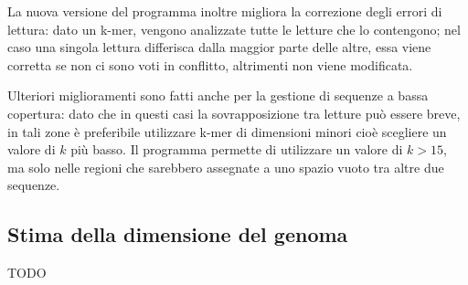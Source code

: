 \documentclass[crop=false, class=book]{standalone}
\begin{document}
	La nuova versione del programma inoltre migliora la correzione degli errori di lettura: dato un k-mer, vengono analizzate tutte le letture che lo contengono; nel caso una singola lettura differisca dalla maggior parte delle altre, essa viene corretta se non ci sono voti in conflitto, altrimenti non viene modificata.
	
	Ulteriori miglioramenti sono fatti anche per la gestione di sequenze a bassa copertura: dato che in questi casi la sovrapposizione tra letture può essere breve, in tali zone è preferibile utilizzare k-mer di dimensioni minori cioè scegliere un valore di $k$ più basso. Il programma permette di utilizzare un valore di $k>15$, ma solo nelle regioni che sarebbero assegnate a uno spazio vuoto tra altre due sequenze. 
	
	\subsection{Stima della dimensione del genoma}
	TODO
	
	
	
	
	
	
	
	
\end{document}
